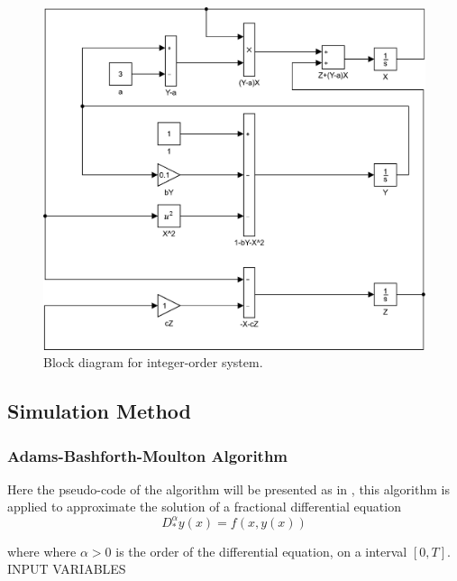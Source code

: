       \begin{figure}[H]
      	\centering
        \includegraphics[scale=0.5]{files/DiagramaBloques.pdf}
        \caption{Block diagram for integer-order system.}
        \label{fig:block}
      \end{figure}
      
      \subsection{Simulation Method}
		\subsubsection{Adams-Bashforth-Moulton Algorithm}
        \label{sec:adam}
		Here the pseudo-code of the algorithm will be presented as in \cite{diethelm2002predictor}, this algorithm is applied to approximate the solution of a fractional differential equation 
        \begin{equation}
        	D_*^\alpha y(x) = f(x,y(x))
        \end{equation}
        
         where where $\alpha>0$ is the order of the differential equation, on a interval $[0,T]$.\\
        
        INPUT VARIABLES
        
